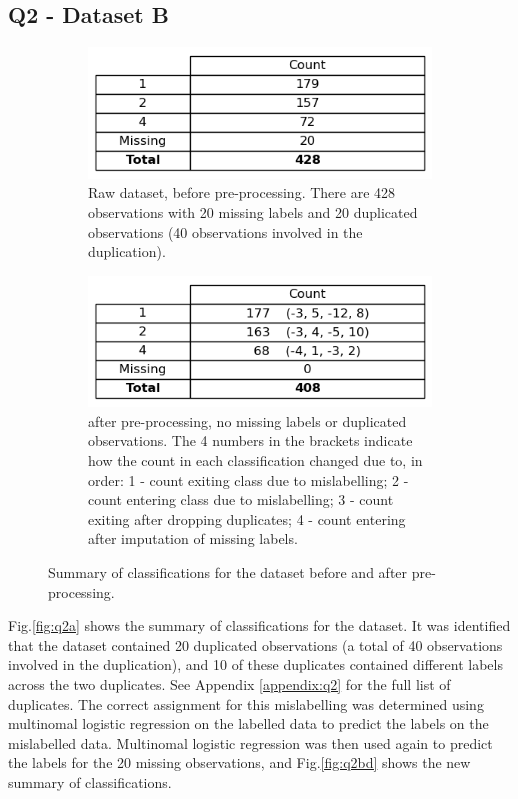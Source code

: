 
\subsection{Q2 - Dataset B}\label{subsec:dataset-b}
    \begin{figure}
    \centering
    \begin{subfigure}{0.9\textwidth}
      \centering
      \includegraphics[width=.55\linewidth]{./figures/q2a}
      \caption{Raw  dataset, before pre-processing. There are 428 observations with 20 missing
        labels and 20 duplicated observations (40 observations involved in the duplication).}
      \label{fig:q2a}
    \end{subfigure}%
    \hfill
    \begin{subfigure}{0.9\textwidth}
      \centering
      \includegraphics[width=0.55\linewidth]{./figures/q2b_q2d}
      \caption{ after pre-processing, no missing labels or duplicated observations.
        The 4 numbers in the brackets indicate how the count in each classification changed due to, in order: 1 -
        count exiting class due to mislabelling; 2 - count entering class due to mislabelling; 3 - count exiting
        after dropping duplicates; 4 - count entering after imputation of missing labels.}
      \label{fig:q2bd}
    \end{subfigure}
    \caption{Summary of classifications for the  dataset before and after pre-processing.}
    \label{fig:q2abd}
    \end{figure}

    Fig.\eqref{fig:q2a} shows the summary of classifications for the  dataset.
    It was identified that the dataset contained 20 duplicated observations (a total of 40 observations involved in the
    duplication), and 10 of these duplicates contained different labels across the two duplicates. See Appendix
    \ref{appendix:q2} for the full list of duplicates.
    The correct assignment for this mislabelling was determined using multinomal logistic regression on the labelled data
    to predict the labels on the mislabelled data.
    Multinomal logistic regression was then used again to predict the labels for the 20 missing observations, and
    Fig.\eqref{fig:q2bd} shows the new summary of classifications.

